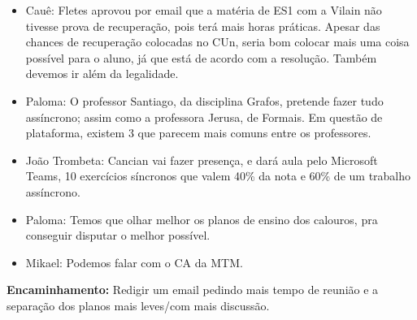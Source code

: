 \documentclass{ata-calico}
\begin{document}
\begin{itemize}
\item Cauê: Fletes aprovou por email que a matéria de ES1 com a Vilain não tivesse prova de recuperação, pois terá mais horas práticas. Apesar das chances de recuperação colocadas no CUn, seria bom colocar mais uma coisa possível para o aluno, já que está de acordo com a resolução. Também devemos ir além da legalidade.
\item Paloma: O professor Santiago, da disciplina Grafos, pretende fazer tudo assíncrono; assim como a professora Jerusa, de Formais. Em questão de plataforma, existem 3 que parecem mais comuns entre os professores.
\item João Trombeta: Cancian vai fazer presença, e dará aula pelo Microsoft Teams, 10 exercícios síncronos que valem 40\% da nota e 60\% de um trabalho assíncrono.
\item Paloma: Temos que olhar melhor os planos de ensino dos calouros, pra conseguir disputar o melhor possível.
\item Mikael: Podemos falar com o CA da MTM.
\end{itemize}

\textbf{Encaminhamento:} Redigir um email pedindo mais tempo de reunião e a separação dos planos mais leves/com mais discussão.

\end{document}
